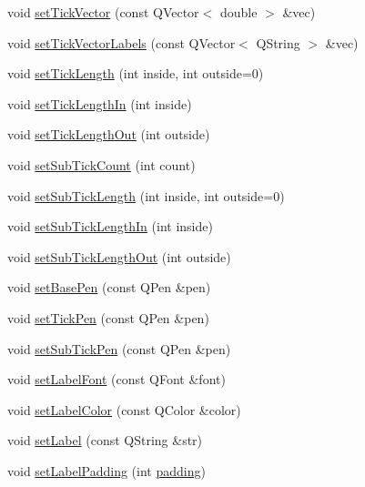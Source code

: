 \begin{DoxyCompactItemize}
\item 
void \hyperlink{class_q_c_p_axis_a871db94c5d796c80fcbe1a9d4506e27e}{set\+Tick\+Vector} (const Q\+Vector$<$ double $>$ \&vec)
\item 
void \hyperlink{class_q_c_p_axis_a921d3ba3853ca3bd2cce3459f7a243ed}{set\+Tick\+Vector\+Labels} (const Q\+Vector$<$ Q\+String $>$ \&vec)
\item 
void \hyperlink{class_q_c_p_axis_a62ec40bebe3540e9c1479a8fd2be3b0d}{set\+Tick\+Length} (int inside, int outside=0)
\item 
void \hyperlink{class_q_c_p_axis_afae1a37a99611366275a51204d991739}{set\+Tick\+Length\+In} (int inside)
\item 
void \hyperlink{class_q_c_p_axis_a3b8a0debd1ffedd2c22d0592dfbb4e62}{set\+Tick\+Length\+Out} (int outside)
\item 
void \hyperlink{class_q_c_p_axis_a4b1554ead9d7f9799650d51383e326dd}{set\+Sub\+Tick\+Count} (int count)
\item 
void \hyperlink{class_q_c_p_axis_ab702d6fd42fc620607435339a1c2a2e1}{set\+Sub\+Tick\+Length} (int inside, int outside=0)
\item 
void \hyperlink{class_q_c_p_axis_ac46fa2a993a9f5789540977610acf1de}{set\+Sub\+Tick\+Length\+In} (int inside)
\item 
void \hyperlink{class_q_c_p_axis_a4c6dfc3963492ed72a77724012df5f23}{set\+Sub\+Tick\+Length\+Out} (int outside)
\item 
void \hyperlink{class_q_c_p_axis_a778d45fb71b3c7ab3bb7079e18b058e4}{set\+Base\+Pen} (const Q\+Pen \&pen)
\item 
void \hyperlink{class_q_c_p_axis_ad80923bcc1c5da4c4db602c5325e797e}{set\+Tick\+Pen} (const Q\+Pen \&pen)
\item 
void \hyperlink{class_q_c_p_axis_aede4028ae7516bd51a60618a8233f9cf}{set\+Sub\+Tick\+Pen} (const Q\+Pen \&pen)
\item 
void \hyperlink{class_q_c_p_axis_a71ac1a47f7547e490a8c4311d1433cf3}{set\+Label\+Font} (const Q\+Font \&font)
\item 
void \hyperlink{class_q_c_p_axis_a6c906fe56d75f0122335b9f79b999608}{set\+Label\+Color} (const Q\+Color \&color)
\item 
void \hyperlink{class_q_c_p_axis_a33bcc382c111c9f31bb0687352a2dea4}{set\+Label} (const Q\+String \&str)
\item 
void \hyperlink{class_q_c_p_axis_a4391192a766e5d20cfe5cbc17607a7a2}{set\+Label\+Padding} (int \hyperlink{class_q_c_p_axis_abb85015a9467ec176e70698307ec833a}{padding})
\item 

\end{DoxyCompactItemize}
